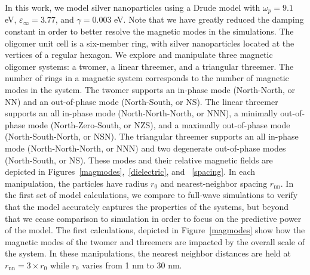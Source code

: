\documentclass[journal=ancac3,manuscript=article]{achemso}
\begin{document}
In this work, we model silver nanoparticles using a Drude model with $\omega_p = 9.1$ eV, $\varepsilon_{\infty} = 3.77$, and $\gamma = 0.003$ eV. Note that we have greatly reduced the damping constant in order to better resolve the magnetic modes in the simulations. The oligomer unit cell is a six-member ring, with silver nanoparticles located at the vertices of a regular hexagon. We explore and manipulate three magnetic oligomer systems: a twomer, a linear threemer, and a triangular threemer. The number of rings in a magnetic system corresponds to the number of magnetic modes in the system\cite{Cherqui2014}. The twomer supports an in-phase mode (North-North, or NN) and an out-of-phase mode (North-South, or NS). The linear threemer supports an all in-phase mode (North-North-North, or NNN), a minimally out-of-phase mode (North-Zero-South, or NZS), and a maximally out-of-phase mode (North-South-North, or NSN). The triangular threemer supports an all in-phase mode (North-North-North, or NNN) and two degenerate out-of-phase modes (North-South, or NS). These modes and their relative magnetic fields are depicted in Figures~\ref{magmodes},~\ref{dielectric}, and ~\ref{spacing}. In each manipulation, the particles have radius $r_0$ and nearest-neighbor spacing $r_{\textrm{nn}}$. In the first set of model calculations, we compare to full-wave simulations to verify that the model accurately captures the properties of the systems, but beyond that we cease comparison to simulation in order to focus on the predictive power of the model. The first calculations, depicted in Figure~\ref{magmodes} show how the magnetic modes of the twomer and threemers are impacted by the overall scale of the system. In these manipulations, the nearest neighbor distances are held at $r_{\textrm{nn}} = 3 \times r_0$ while $r_0$ varies from 1 nm to 30 nm.
\end{document}
